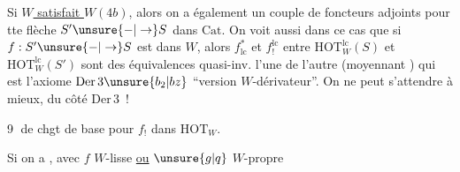 Si \uline{$W$ satisfait $W(4b)$}, alors on a également un couple de foncteurs adjoints
pour tte flèche $S'\unsure{\mathbin{-}|\to}S$ dans $\mathrm{Cat}$.  On voit aussi dans ce cas que
\margin{$\vert$}
si $f:S'\unsure{\mathbin{-}|\to}S$ est dans $W$, alors $f^*_{\mathrm{lc}}$ et $f_!^{\mathrm{lc}}$ entre $\mathrm{HOT}_W^{\mathrm{lc}}(S)$ et $\mathrm{HOT}_W^{\mathrm{lc}}(S')$ sont des équivalences quasi-inv. l'une de l'autre (moyennant )
qui est l'axiome $\mathrm{Der}\,3\unsure{b_2|bz}$ ``version $W$-dérivateur''. On ne peut s'attendre à mieux, du côté $\mathrm{Der}\,3$~!

\textcircled{9}  de chgt de base pour $f_!$ dans $\mathrm{HOT}_W$.

Si on a
, avec $f$ $W$-lisse \uline{ou} $\unsure{g|q}$ $W$-propre

